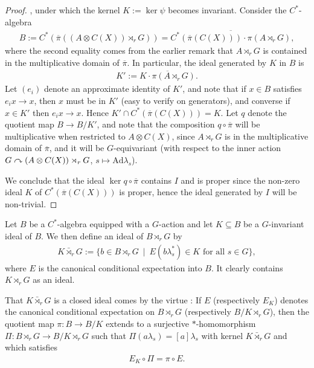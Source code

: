\begin{proof}
	, under which the kernel $K := \ker \psi$ becomes invariant. Consider the $C^*$-algebra 
	\begin{align*}
		B := C^*(\overline \pi ( ( A \otimes C(X)) \rtimes_r G)) = \overline{ C^*(\overline \pi(C(X))) \cdot \pi(A \rtimes_r G)},
	\end{align*}
	where the second equality comes from the earlier remark that $A \rtimes_r G$ is contained in the multiplicative domain of $\overline \pi$. In particular, the ideal generated by $K$ in $B$ is
	\begin{align*}
		K' :=\overline{K \cdot \pi(A \rtimes_r G)}.
	\end{align*}
	Let $(e_i)$ denote an approximate identity of $K'$, and note that if $x \in B$ satisfies $e_i x \to x$, then $x$ must be in $K'$ (easy to verify on generators), and converse if $x \in K'$ then $e_i x \to x$. Hence $K' \cap C^*(\overline \pi(C(X))) = K$. Let $q$ denote the quotient map $B \to B/K'$, and note that the composition $q \circ \overline \pi$ will be multiplicative when restricted to $A \otimes C(X)$, since $A \rtimes_r G$ is in the multiplicative domain of $\overline \pi$, and it will be $G$-equivariant (with respect to the inner action $G \stackrel{}{\curvearrowright} (A \otimes C(X))\rtimes_r G$, $s \mapsto \mathrm{Ad} \lambda_s$). 

	We conclude that the ideal $\ker q \circ \overline \pi$ contains $I$ and is proper since the non-zero ideal $K$ of $C^*(\overline \pi(C(X)))$ is proper, hence the ideal generated by $I$ will be non-trivial.
\end{proof}
\begin{definition}
	Let $B$ be a $C^*$-algebra equipped with a $G$-action and let $K \subseteq B$ be a $G$-invariant ideal of $B$. We then define an ideal  of $B \rtimes_r G$ by
	\begin{align*}
		K \bar \rtimes_r G := \{b \in B \rtimes_r G \ \mid \ E(b \lambda_s^* ) \in K \text{ for all } s \in G\},
	\end{align*}
	where $E$ is the canonical conditional expectation into $B$. It clearly contains $K \rtimes_r G$ as an ideal.
\end{definition}
\begin{remark}
	That $K \bar \rtimes_r G$ is a closed ideal comes by the virtue \cite[lemma 3.2]{hamana1979injective}: If $E$ (respectively $E_K$) denotes the canonical conditional expectation on $B \rtimes_r G$ (respectively $B/K \rtimes_r G$), then the quotient map $\pi \colon B \to B/K$ extends to a surjective $*$-homomorphism $\Pi \colon B \rtimes_r G \to B/K \rtimes_r G$ such that $\Pi(a \lambda_s) = [a] \lambda_s$ with kernel $K \bar \rtimes_r G$ and which satisfies
	\begin{align*}
		E_K \circ \Pi =  \pi \circ E.
	\end{align*}
	\label{condidealrem}
\end{remark}
